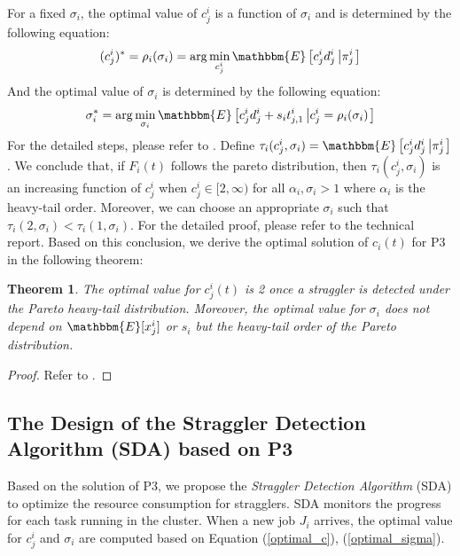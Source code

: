 \documentclass[10pt,conference]{IEEEtran}
\newtheorem{Theorem}{Theorem}
\begin{document}
For a fixed $\sigma_i$, the optimal value of $c^i_j$ is a function of $\sigma_i$ and is determined by the following equation:
\begin{equation}
(c^i_j)^* = \rho_i(\sigma_i) = \arg \min_{c^i_j}\mathbbm{E} \left[c^i_j  d^i_j  \left|  \pi^i_j \right.\right]
\label{optimal_c}
\end{equation}
And the optimal value of $\sigma_i$ is determined by the following equation:
\begin{equation}
\sigma_i^* = \arg{\min_{\sigma_i}\mathbbm{E} \left[  c^i_j  d^i_j + s_i  t^i_{j,1} \left| c^i_j =  \rho_i(\sigma_i) \right. \right]}
\label{optimal_sigma}
\end{equation}
For the detailed steps, please refer to \cite{speculative-multi-job}.
Define $\tau_i(c^i_j,\sigma_i) = \mathbbm{E} \left[c^i_j  d^i_j  \left|  \pi^i_j \right.\right]$. We conclude that, if $F_i(t)$ follows the pareto distribution, then $\tau_i(c^i_j,\sigma_i)$ is an increasing function of $c^i_j$ when $c^i_j \in [2,\infty)$ for all $\alpha_i, \sigma_i > 1$ where $\alpha_i$ is the heavy-tail order. Moreover, we can choose an appropriate $\sigma_i$ such that $\tau_i(2,\sigma_i) < \tau_i(1,\sigma_i)$. For the detailed proof, please refer to the technical report. Based on this conclusion, we derive the optimal solution of $c_i(t)$ for P3 in the following theorem:
\begin{Theorem}
\label{Theorem 2}
The optimal value for $c^i_j(t)$ is 2 once a straggler is detected under the Pareto heavy-tail distribution. Moreover, the optimal value for $\sigma_i$ does not depend on $\mathbbm{E}[x^i_j]$ or $s_i$  but  the heavy-tail order of the Pareto distribution.
\label{optimal_c_i_j}
\end{Theorem}
\begin{proof}
Refer to \cite{speculative-multi-job}.
\end{proof}


\subsection{The Design of  the Straggler Detection Algorithm (SDA) based on P3}
Based on the solution of P3, we propose the \textit{Straggler Detection Algorithm} (SDA) to optimize the resource consumption for stragglers. SDA monitors the progress for each task running in the cluster. When a new job $J_i$ arrives, the optimal value for $c^i_j$ and $\sigma_i$ are computed based on Equation (\ref{optimal_c}), (\ref{optimal_sigma}).
\end{document}
